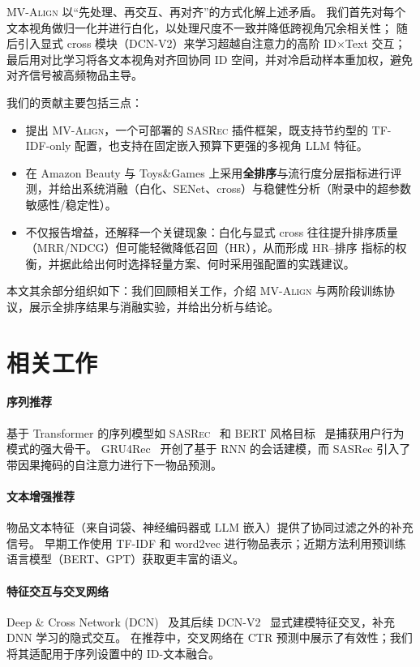 \documentclass[sigconf,natbib=true]{acmart}
\newcommand{\model}{\textsc{MV-Align}\xspace}
\newcommand{\base}{\textsc{SASRec}\xspace}
\newcommand{\tfidf}{\textsc{TF-IDF}\xspace}
\newcommand{\llm}{\textsc{LLM}\xspace}
\begin{document}
\model 以“先处理、再交互、再对齐”的方式化解上述矛盾。
我们首先对每个文本视角做归一化并进行白化，以处理尺度不一致并降低跨视角冗余相关性；
随后引入显式 cross 模块（DCN-V2）来学习超越自注意力的高阶 ID$\times$Text 交互；
最后用对比学习将各文本视角对齐回协同 ID 空间，并对冷启动样本重加权，避免对齐信号被高频物品主导。

我们的贡献主要包括三点：
\begin{itemize}[leftmargin=*,itemsep=1pt]
  \item 提出 \model，一个可部署的 \base 插件框架，既支持节约型的 \tfidf-only 配置，也支持在固定嵌入预算下更强的多视角 \llm 特征。
  \item 在 Amazon Beauty 与 Toys\&Games 上采用\textbf{全排序}与流行度分层指标进行评测，并给出系统消融（白化、SENet、cross）与稳健性分析（附录中的超参数敏感性/稳定性）。
  \item 不仅报告增益，还解释一个关键现象：白化与显式 cross 往往提升排序质量（MRR/NDCG）但可能轻微降低召回（HR），从而形成 HR--排序 指标的权衡，并据此给出何时选择轻量方案、何时采用强配置的实践建议。
\end{itemize}
本文其余部分组织如下：我们回顾相关工作，介绍 \model 与两阶段训练协议，展示全排序结果与消融实验，并给出分析与结论。

\section{相关工作}
\paragraph{序列推荐}
基于 Transformer 的序列模型如 \base~\cite{kang2018sasrec} 和 BERT 风格目标~\cite{sun2019bert4rec} 是捕获用户行为模式的强大骨干。
GRU4Rec~\cite{hidasi2016gru4rec} 开创了基于 RNN 的会话建模，而 SASRec 引入了带因果掩码的自注意力进行下一物品预测。

\paragraph{文本增强推荐}
物品文本特征（来自词袋、神经编码器或 \llm 嵌入）提供了协同过滤之外的补充信号。
早期工作使用 TF-IDF 和 word2vec 进行物品表示；近期方法利用预训练语言模型（BERT、GPT）获取更丰富的语义。

\paragraph{特征交互与交叉网络}
Deep \& Cross Network (DCN)~\cite{wang2017dcn} 及其后续 DCN-V2~\cite{wang2021dcnv2} 显式建模特征交叉，补充 DNN 学习的隐式交互。
在推荐中，交叉网络在 CTR 预测中展示了有效性；我们将其适配用于序列设置中的 ID-文本融合。
\end{document}
